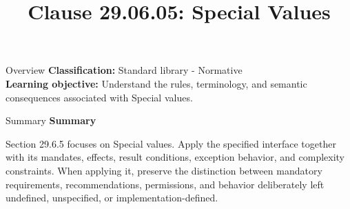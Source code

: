\documentclass[10pt,letterpaper]{article}
\title{Clause 29.06.05: Special Values}
\author{}
\date{}
\begin{document}
\maketitle
\begin{CornellOverviewBox}{Overview}
\textbf{Classification:} Standard library - Normative\\[2pt]
\textbf{Learning objective:} Understand the rules, terminology, and semantic consequences associated with Special values.
\end{CornellOverviewBox}\begin{CornellSummaryBox}{Summary}
{\sffamily\bfseries\color{Accent} Summary}\par\vspace{3pt}Section 29.6.5 focuses on Special values. Apply the specified interface together with its mandates, effects, result conditions, exception behavior, and complexity constraints. When applying it, preserve the distinction between mandatory requirements, recommendations, permissions, and behavior deliberately left undefined, unspecified, or implementation-defined.
\end{CornellSummaryBox}
\end{document}

